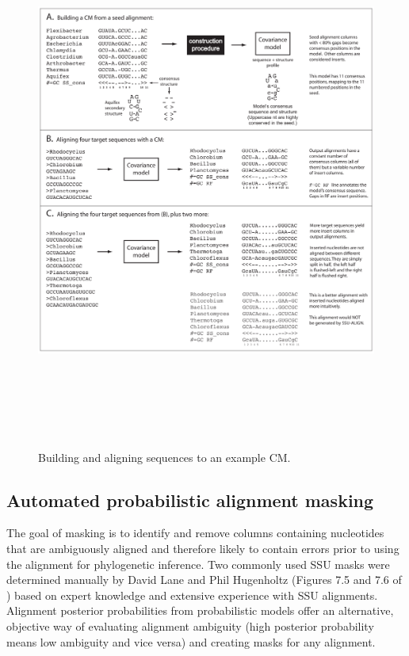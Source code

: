 \begin{figure}
\begin{center}
\includegraphics[height=7in]{Figures/sa-toy-example}
\caption{Building and aligning sequences to an example CM.}
\end{center}
\label{fig:toyex}
\end{figure}


\subsection{Automated probabilistic alignment masking}

The goal of masking is to identify and remove columns containing
nucleotides that are ambiguously aligned and therefore likely to contain
errors prior to using the alignment for phylogenetic inference.  Two
commonly used SSU masks were determined manually by David Lane and
Phil Hugenholtz (Figures 7.5 and 7.6 of \cite{Nawrocki09b}) based on
expert knowledge and extensive experience with SSU alignments.
Alignment posterior probabilities from
probabilistic models offer an alternative, objective way of evaluating
alignment ambiguity (high posterior probability means low ambiguity
and vice versa) and creating masks for any alignment.

